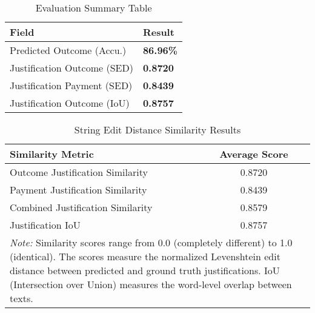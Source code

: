
\begin{table}[H]
\centering
\caption{Evaluation Summary Table}
\label{tab:evaluation_summary}
\begin{tabular}{@{}lp{2cm}@{}}
\toprule
\textbf{Field} & \textbf{Result} \\
\midrule
Predicted Outcome (Accu.) & \textbf{86.96\%} \\
Justification Outcome (SED) &  \textbf{0.8720} \\
Justification Payment (SED) &  \textbf{0.8439} \\
Justification Outcome (IoU) &  \textbf{0.8757} \\
\bottomrule
\end{tabular}
\end{table}

\begin{table}[H]
\centering
\caption{String Edit Distance Similarity Results}
\label{tab:string_edit_distance_results}
\begin{tabular}{lc}
\toprule
\textbf{Similarity Metric} & \textbf{Average Score} \\
\midrule
Outcome Justification Similarity & 0.8720 \\
Payment Justification Similarity & 0.8439 \\
Combined Justification Similarity & 0.8579 \\
Justification IoU & 0.8757 \\
\midrule
\multicolumn{2}{p{13cm}}{\textit{Note:} Similarity scores range from 0.0 (completely different) to 1.0 (identical). 
The scores measure the normalized Levenshtein edit distance between predicted and ground truth justifications.
IoU (Intersection over Union) measures the word-level overlap between texts.} \\
\bottomrule
\end{tabular}
\end{table}

